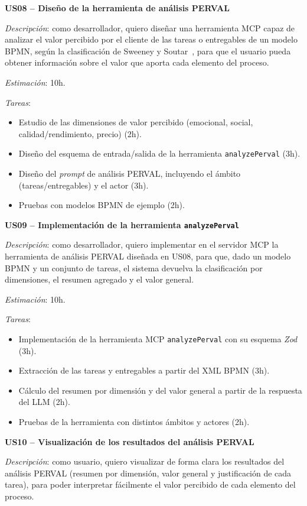 {\textbf{US08 -- Diseño de la herramienta de análisis PERVAL}

\textit{Descripción}: como desarrollador, quiero diseñar una herramienta MCP capaz de analizar el valor percibido por el cliente de las tareas o entregables de un modelo BPMN, según la clasificación de Sweeney y Soutar~\cite{sweeney2001perval}, para que el usuario pueda obtener información sobre el valor que aporta cada elemento del proceso.

\textit{Estimación}: 10h.

\textit{Tareas}:
\begin{itemize}
    \item Estudio de las dimensiones de valor percibido (emocional, social, calidad/rendimiento, precio) (2h).
    \item Diseño del esquema de entrada/salida de la herramienta \texttt{analyzePerval} (3h).
    \item Diseño del \textit{prompt} de análisis PERVAL, incluyendo el ámbito (tareas/entregables) y el actor (3h).
    \item Pruebas con modelos BPMN de ejemplo (2h).
\end{itemize}


\textbf{US09 -- Implementación de la herramienta \texttt{analyzePerval}}

\textit{Descripción}: como desarrollador, quiero implementar en el servidor MCP la herramienta de análisis PERVAL diseñada en US08, para que, dado un modelo BPMN y un conjunto de tareas, el sistema devuelva la clasificación por dimensiones, el resumen agregado y el valor general.

\textit{Estimación}: 10h.

\textit{Tareas}:
\begin{itemize}
    \item Implementación de la herramienta MCP \texttt{analyzePerval} con su esquema \textit{Zod} (3h).
    \item Extracción de las tareas y entregables a partir del XML BPMN (3h).
    \item Cálculo del resumen por dimensión y del valor general a partir de la respuesta del LLM (2h).
    \item Pruebas de la herramienta con distintos ámbitos y actores (2h).
\end{itemize}

\textbf{US10 -- Visualización de los resultados del análisis PERVAL}

\textit{Descripción}: como usuario, quiero visualizar de forma clara los resultados del análisis PERVAL (resumen por dimensión, valor general y justificación de cada tarea), para poder interpretar fácilmente el valor percibido de cada elemento del proceso.

}

